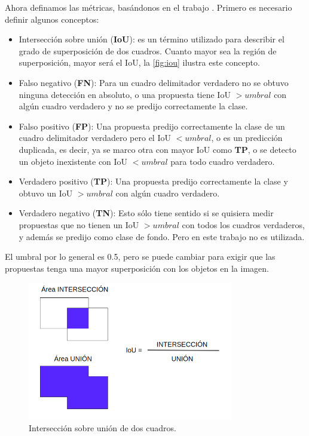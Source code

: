 Ahora definamos las métricas, basándonos en el trabajo \cite{padilla2020survey}. Primero es necesario definir algunos conceptos:
\begin{itemize}
    \item Intersección sobre unión (\textbf{IoU}): es un término utilizado para describir el grado de superposición de dos cuadros. Cuanto mayor sea la región de superposición, mayor será el IoU, la \autoref{fig:iou} ilustra este concepto.
	\item Falso negativo (\textbf{FN}): Para un cuadro delimitador verdadero no se obtuvo ninguna detección en absoluto, o una propuesta tiene IoU $> umbral$ con algún cuadro verdadero y no se predijo correctamente la clase.
	\item Falso positivo (\textbf{FP}): Una propuesta predijo correctamente la clase de un cuadro delimitador verdadero pero el IoU $< umbral$, o es un predicción duplicada, es decir, ya se marco otra con mayor IoU como \textbf{TP}, o se detecto un objeto inexistente con IoU $< umbral$ para todo cuadro verdadero.
	\item Verdadero positivo (\textbf{TP}): Una propuesta predijo correctamente la clase y obtuvo un IoU $> umbral$ con algún cuadro verdadero.
	\item Verdadero negativo (\textbf{TN}): Esto sólo tiene sentido si se quisiera medir propuestas que no tienen un IoU $> umbral$ con todos los cuadros verdaderos, y además se predijo como clase de fondo. Pero en este trabajo no es utilizada.
\end{itemize}
El umbral por lo general es 0.5, pero se puede cambiar para exigir que las propuestas tenga una mayor superposición con los objetos en la imagen.\\

\begin{figure}
	\begin{center}
		\centering
		\includegraphics[width=0.8\textwidth]{img/iou.png}
		\caption{Intersección sobre unión de dos cuadros.}
		\label{fig:iou}
	\end{center}	
\end{figure}

